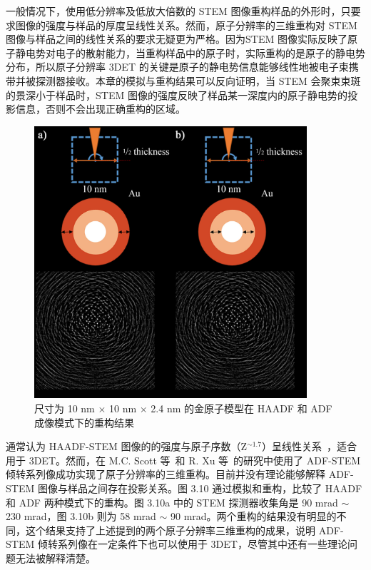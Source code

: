 一般情况下，使用低分辨率及低放大倍数的 STEM 图像重构样品的外形时，只要求图像的强度与样品的厚度呈线性关系。然而，原子分辨率的三维重构对 STEM 图像与样品之间的线性关系的要求无疑更为严格。因为STEM 图像实际反映了原子静电势对电子的散射能力，当重构样品中的原子时，实际重构的是原子的静电势分布，所以原子分辨率 3DET 的关键是原子的静电势信息能够线性地被电子束携带并被探测器接收。本章的模拟与重构结果可以反向证明，当 STEM 会聚束束斑的景深小于样品时，STEM 图像的强度反映了样品某一深度内的原子静电势的投影信息，否则不会出现正确重构的区域。 

\begin{figure}[htbp]
	\vspace{\baselineskip}
	\centering
	\includegraphics[width=0.9\textwidth]{../4.9/49}
	\caption{尺寸为 10 nm $\times$ 10 nm $\times$ 2.4 nm 的金原子模型在 HAADF 和 ADF 成像模式下的重构结果}\label{fig:49}
	\song{}
\end{figure}

通常认为 HAADF-STEM 图像的的强度与原子序数（Z$^{\sim1.7}$）呈线性关系~\cite{Kubel2005}，适合用于 3DET。然而，在 M.C. Scott 等~\cite{Scott2012}和 R. Xu 等~\cite{Xu2015}的研究中使用了 ADF-STEM 倾转系列像成功实现了原子分辨率的三维重构。目前并没有理论能够解释 ADF-STEM 图像与样品之间存在投影关系。图 3.10 通过模拟和重构，比较了 HAADF 和 ADF 两种模式下的重构。图 3.10a 中的 STEM 探测器收集角是 90 mrad $\sim$ 230 mrad，图 3.10b 则为 58 mrad $\sim$ 90 mrad。两个重构的结果没有明显的不同，这个结果支持了上述提到的两个原子分辨率三维重构的成果，说明 ADF-STEM 倾转系列像在一定条件下也可以使用于 3DET，尽管其中还有一些理论问题无法被解释清楚。

